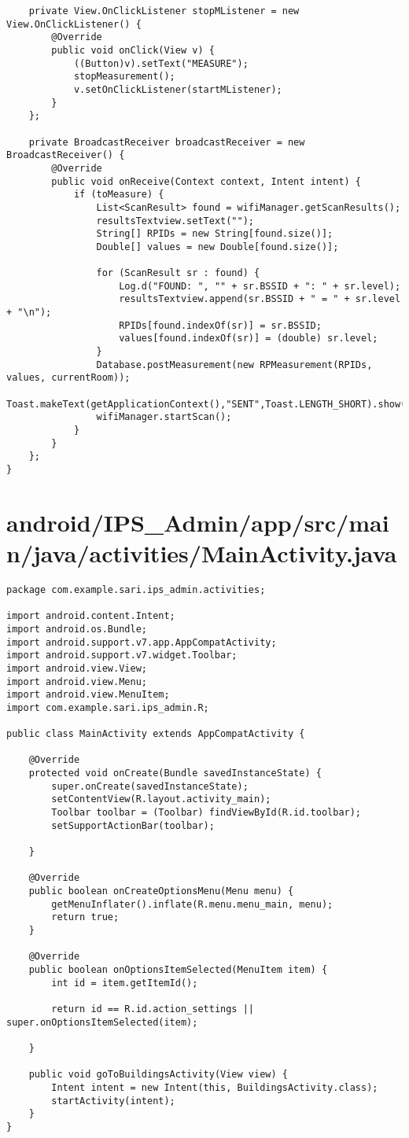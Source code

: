 \begin{lstlisting}
    private View.OnClickListener stopMListener = new View.OnClickListener() {
        @Override
        public void onClick(View v) {
            ((Button)v).setText("MEASURE");
            stopMeasurement();
            v.setOnClickListener(startMListener);
        }
    };

    private BroadcastReceiver broadcastReceiver = new BroadcastReceiver() {
        @Override
        public void onReceive(Context context, Intent intent) {
            if (toMeasure) {
                List<ScanResult> found = wifiManager.getScanResults();
                resultsTextview.setText("");
                String[] RPIDs = new String[found.size()];
                Double[] values = new Double[found.size()];

                for (ScanResult sr : found) {
                    Log.d("FOUND: ", "" + sr.BSSID + ": " + sr.level);
                    resultsTextview.append(sr.BSSID + " = " + sr.level + "\n");
                    RPIDs[found.indexOf(sr)] = sr.BSSID;
                    values[found.indexOf(sr)] = (double) sr.level;
                }
                Database.postMeasurement(new RPMeasurement(RPIDs, values, currentRoom));
                Toast.makeText(getApplicationContext(),"SENT",Toast.LENGTH_SHORT).show();
                wifiManager.startScan();
            }
        }
    };
}
\end{lstlisting}
\newpage
\section{android/IPS\_Admin/app/src/main/java/activities/MainActivity.java}
\begin{lstlisting}package com.example.sari.ips_admin.activities;

import android.content.Intent;
import android.os.Bundle;
import android.support.v7.app.AppCompatActivity;
import android.support.v7.widget.Toolbar;
import android.view.View;
import android.view.Menu;
import android.view.MenuItem;
import com.example.sari.ips_admin.R;

public class MainActivity extends AppCompatActivity {

    @Override
    protected void onCreate(Bundle savedInstanceState) {
        super.onCreate(savedInstanceState);
        setContentView(R.layout.activity_main);
        Toolbar toolbar = (Toolbar) findViewById(R.id.toolbar);
        setSupportActionBar(toolbar);

    }

    @Override
    public boolean onCreateOptionsMenu(Menu menu) {
        getMenuInflater().inflate(R.menu.menu_main, menu);
        return true;
    }

    @Override
    public boolean onOptionsItemSelected(MenuItem item) {
        int id = item.getItemId();

        return id == R.id.action_settings || super.onOptionsItemSelected(item);

    }

    public void goToBuildingsActivity(View view) {
        Intent intent = new Intent(this, BuildingsActivity.class);
        startActivity(intent);
    }
}
\end{lstlisting}
\newpage
